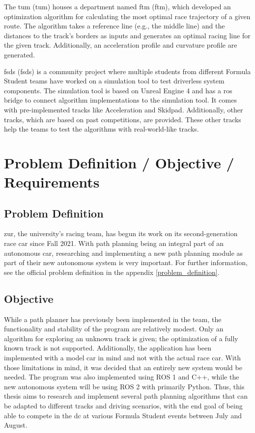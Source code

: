 The \acrlong{tum} (\acrshort{tum}) houses a department named \acrlong{ftm} (\acrshort{ftm}), which developed an optimization algorithm for calculating the most optimal race trajectory of a given route. The algorithm takes a reference line (e.g., the middle line) and the distances to the track's borders as inputs and generates an optimal racing line for the given track. Additionally, an acceleration profile and curvature profile are generated. \cite{minimum_curvature_trajectory_planning} \cite{minimum_time_trajectory_planning} \cite{tumftm_optimization_algoritm} \cite{tumftm_trajectory_planning_helpers}

\acrlong{fsds} (\acrshort{fsds}) is a community project where multiple students from different Formula Student teams have worked on a simulation tool to test driverless system components. The simulation tool is based on Unreal Engine 4 \cite{unreal_engine} and has a \acrshort{ros} bridge to connect algorithm implementations to the simulation tool. It comes with pre-implemented tracks like Acceleration and Skidpad. Additionally, other tracks, which are based on past competitions, are provided. These other tracks help the teams to test the algorithms with real-world-like tracks. \cite{fsds_github}

\section{Problem Definition / Objective / \newline Requirements} \label{sec:Problem Definition / Objective / Requirements}
\subsection{Problem Definition} \label{sec:Problem Definition}
\acrlong{zur}, the university's racing team, has begun its work on its second-generation race car since Fall 2021. With path planning being an integral part of an autonomous car, researching and implementing a new path planning module as part of their new autonomous system is very important. For further information, see the official problem definition in the appendix \ref{problem_definition}.

\subsection{Objective} \label{sec:Objective}
While a path planner has previously been implemented in the team, the functionality and stability of the program are relatively modest. Only an algorithm for exploring an unknown track is given; the optimization of a fully known track is not supported. Additionally, the application has been implemented with a model car in mind and not with the actual race car. With those limitations in mind, it was decided that an entirely new system would be needed. The program was also implemented using ROS 1 and C++, while the new autonomous system will be using ROS 2 with primarily Python. Thus, this thesis aims to research and implement several path planning algorithms that can be adapted to different tracks and driving scenarios, with the end goal of being able to compete in the \acrlong{dc} at various Formula Student events between July and August.

